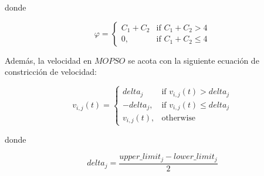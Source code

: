 


donde


\begin{equation}
\varphi= 
\begin{cases}
C_1 + C_2 & \text{if } C_1 + C_2 > 4\\
0,              & \text{if } C_1 + C_2 \leq 4
\end{cases}
\end{equation}

Además, la velocidad en $MOPSO$ se acota con la siguiente ecuación de constricción de velocidad:

\begin{equation}\label{eq:restricciondelta}
v_{i,j}(t)= 
\begin{cases}
delta_j & \text{if } v_{i,j}(t) > delta_j\\
-delta_j,      & \text{if } v_{i,j}(t) \leq delta_j \\
v_{i,j}(t),      & \text{otherwise }
\end{cases}
\end{equation}

donde


\begin{equation}
delta_j=\frac{upper\_limit_j - lower\_limit_j}{2}
\end{equation}

